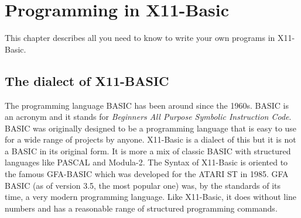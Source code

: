 
\chapter{Programming in X11-Basic}

\vspace{0.5cm}

This chapter describes all you need to know to write your own programs
in X11-Basic.

\section{The dialect of X11-BASIC}

The programming language BASIC has been around since the 1960s. BASIC is an
acronym and it stands for {\em Beginners All Purpose Symbolic Instruction
Code}. BASIC was originally designed to be a programming language that is easy
to use for a wide range of projects by anyone.
X11-Basic is a dialect of this but it is not a BASIC in its original form. It is
more a mix of classic BASIC with structured languages like PASCAL and Modula-2.
The Syntax of X11-Basic is oriented to the famous GFA-BASIC which was
developed for the ATARI ST in 1985. GFA BASIC (as of version 3.5, the most
popular one) was, by the standards of its time, a very modern programming
language. Like X11-Basic, it does without line numbers and has a
reasonable range of structured programming commands.

